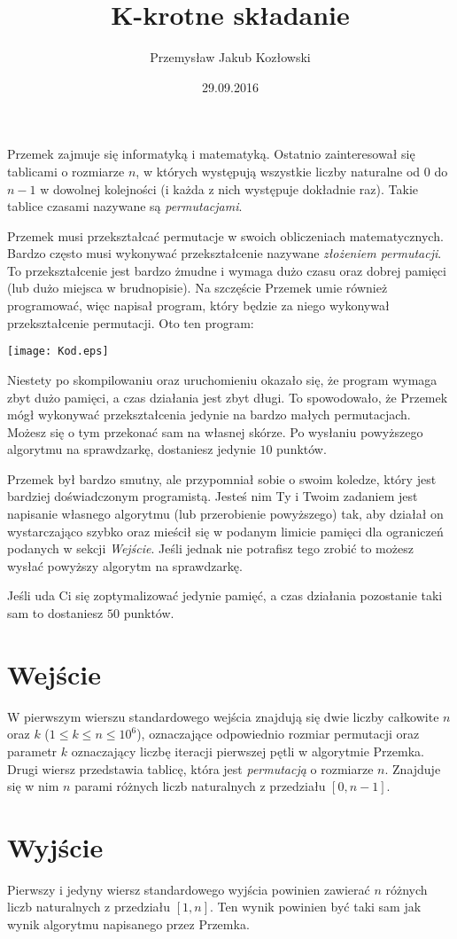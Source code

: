 \documentclass[zad,zawodnik,utf8]{sinol}
\title{K-krotne składanie}
\author{Przemysław Jakub Kozłowski} %
\date{29.09.2016}
\begin{document}
\begin{tasktext}%
Przemek zajmuje się informatyką i matematyką. Ostatnio zainteresował się tablicami o rozmiarze $n$, w których występują wszystkie liczby naturalne od $0$ do $n-1$ w dowolnej kolejności (i każda z nich występuje dokładnie raz). Takie tablice czasami nazywane są \textit{permutacjami}.

Przemek musi przekształcać permutacje w swoich obliczeniach matematycznych. Bardzo często musi wykonywać przekształcenie nazywane \textit{złożeniem permutacji}.  To przekształcenie jest bardzo żmudne i wymaga dużo czasu oraz dobrej pamięci (lub dużo miejsca w brudnopisie). Na szczęście Przemek umie również programować, więc napisał program, który będzie za niego wykonywał przekształcenie permutacji. Oto ten program:

\texttt{[image: Kod.eps]}

Niestety po skompilowaniu oraz uruchomieniu okazało się, że program wymaga zbyt dużo pamięci, a czas działania jest zbyt długi. To spowodowało, że Przemek mógł wykonywać przekształcenia jedynie na bardzo małych permutacjach. Możesz się o tym przekonać sam na własnej skórze. Po wysłaniu powyższego algorytmu na sprawdzarkę, dostaniesz jedynie $10$ punktów.

Przemek był bardzo smutny, ale przypomniał sobie o swoim koledze, który jest bardziej doświadczonym programistą. Jesteś nim Ty i Twoim zadaniem jest napisanie własnego algorytmu (lub przerobienie powyższego) tak, aby działał on wystarczająco szybko oraz mieścił się w podanym limicie pamięci dla ograniczeń podanych w sekcji \textit{Wejście}. Jeśli jednak nie potrafisz tego zrobić to możesz wysłać powyższy algorytm na sprawdzarkę.

Jeśli uda Ci się zoptymalizować jedynie pamięć, a czas działania pozostanie taki sam to dostaniesz $50$ punktów.

  \section{Wejście}
W pierwszym wierszu standardowego wejścia znajdują się dwie liczby całkowite $n$ oraz $k$ ($1 \leq k \leq n \leq 10^6$), oznaczające odpowiednio rozmiar permutacji oraz parametr $k$ oznaczający liczbę iteracji pierwszej pętli w algorytmie Przemka. Drugi wiersz przedstawia tablicę, która jest \textit{permutacją} o rozmiarze $n$. Znajduje się w nim $n$ parami różnych liczb naturalnych z przedziału $[0,n-1]$.

  \section{Wyjście}
Pierwszy i jedyny wiersz standardowego wyjścia powinien zawierać $n$ różnych liczb naturalnych z przedziału $[1,n]$. Ten wynik powinien być taki sam jak wynik algorytmu napisanego przez Przemka.

\makecompactexample

\end{tasktext}
\end{document}
